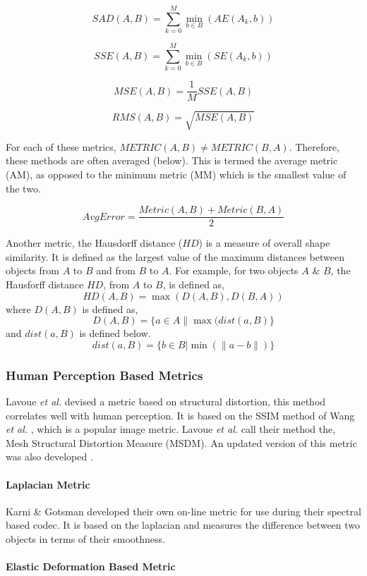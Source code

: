 $$
SAD(A,B) = \sum_{k=0}^{M} \min_{b \in B}(AE(A_k,b))
$$

$$
SSE(A,B) = \sum_{k=0}^{M} \min_{b \in B}(SE(A_k,b))
$$

$$
MSE(A,B) = \frac{1}{M}SSE(A,B)
$$

$$
RMS(A,B) = \sqrt{MSE(A,B)}
$$

For each of these metrics, $METRIC(A,B) \neq METRIC(B,A)$. Therefore, these methods are often averaged (below). This is termed the average metric (AM), as opposed to the minimum metric (MM) which is the smallest value of the two.

$$
AvgError = \frac{Metric(A,B)+Metric(B,A)}{2}
$$

Another metric, the Hausdorff distance ($HD$) is a measure of overall shape similarity. It is defined as the largest value of the maximum distances between objects from $A$ to $B$ and from $B$ to $A$. For example, for two objects $A$ \& $B$, the Hausforff distance $HD$, from $A$ to $B$, is defined as,
$$
HD(A,B) = \max(D(A,B),D(B,A))
$$
where $D(A,B)$ is defined as,
$$
D(A,B) = \{a \in A \| \max(dist(a,B)\}
$$
and $dist(a,B)$ is defined below.
$$
dist(a,B) = \{b \in B \left| \min(\|a-b\|)\right.\}
$$

\subsubsection{Human Perception Based Metrics}

Lavoue \textit{et al.} \cite{Lavoue06Perceptually} devised a metric based on structural distortion, this method correlates well with human perception. It is based on the SSIM method of Wang \textit{et al.} \cite{Wang04Image}, which is a popular image metric. Lavoue \textit{et al.} call their method the, Mesh Structural Distortion Measure (MSDM). An updated version of this metric was also developed \cite{Lavoue11Multiscale}.

\paragraph{Laplacian Metric}

Karni \& Gotsman \cite{Karni00Spectral} developed their own on-line metric for use during their spectral based codec. It is based on the laplacian and measures the difference between two objects in terms of their smoothness. 

\paragraph{Elastic Deformation Based Metric}

